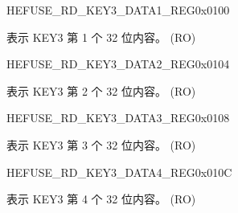 \begin{register}{H}{EFUSE\_RD\_KEY3\_DATA1\_REG}{0x{}0100}\label{regdesc:EFUSERDKEY3DATA1REG}
%
\regnewline%
\begin{regdesc}\begin{reglist}
\label{fielddesc:EFUSEKEY3DATA1}\item [EFUSE\_KEY3\_DATA1] 表示 KEY3 第 1 个 32 位内容。 (RO)
\end{reglist}\end{regdesc}
\end{register}


\begin{register}{H}{EFUSE\_RD\_KEY3\_DATA2\_REG}{0x{}0104}\label{regdesc:EFUSERDKEY3DATA2REG}
%
\regnewline%
\begin{regdesc}\begin{reglist}
\label{fielddesc:EFUSEKEY3DATA2}\item [EFUSE\_KEY3\_DATA2] 表示 KEY3 第 2 个 32 位内容。 (RO)
\end{reglist}\end{regdesc}
\end{register}


\begin{register}{H}{EFUSE\_RD\_KEY3\_DATA3\_REG}{0x{}0108}\label{regdesc:EFUSERDKEY3DATA3REG}
%
\regnewline%
\begin{regdesc}\begin{reglist}
\label{fielddesc:EFUSEKEY3DATA3}\item [EFUSE\_KEY3\_DATA3] 表示 KEY3 第 3 个 32 位内容。 (RO)
\end{reglist}\end{regdesc}
\end{register}


\begin{register}{H}{EFUSE\_RD\_KEY3\_DATA4\_REG}{0x{}010C}\label{regdesc:EFUSERDKEY3DATA4REG}
%
\regnewline%
\begin{regdesc}\begin{reglist}
\label{fielddesc:EFUSEKEY3DATA4}\item [EFUSE\_KEY3\_DATA4] 表示 KEY3 第 4 个 32 位内容。 (RO)
\end{reglist}\end{regdesc}
\end{register}


